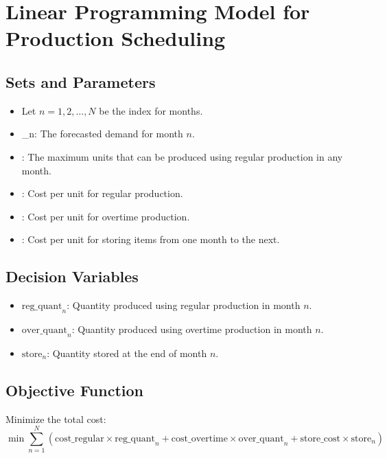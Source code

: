 \documentclass{article}
\begin{document}
\section*{Linear Programming Model for Production Scheduling}

\subsection*{Sets and Parameters}
\begin{itemize}
    \item Let \( n = 1, 2, \ldots, N \) be the index for months.
    \item {}_{n}: The forecasted demand for month \( n \).
    \item {}: The maximum units that can be produced using regular production in any month.
    \item {}: Cost per unit for regular production.
    \item {}: Cost per unit for overtime production.
    \item {}: Cost per unit for storing items from one month to the next.
\end{itemize}

\subsection*{Decision Variables}
\begin{itemize}
    \item \( \text{reg\_quant}_{n} \): Quantity produced using regular production in month \( n \).
    \item \( \text{over\_quant}_{n} \): Quantity produced using overtime production in month \( n \).
    \item \( \text{store}_{n} \): Quantity stored at the end of month \( n \).
\end{itemize}

\subsection*{Objective Function}
Minimize the total cost:
\[
\min \sum_{n=1}^{N} \left( \text{cost\_regular} \times \text{reg\_quant}_{n} + \text{cost\_overtime} \times \text{over\_quant}_{n} + \text{store\_cost} \times \text{store}_{n} \right)
\]
\end{document}
